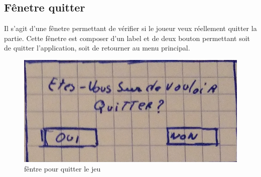 \subsection{Fênetre quitter}
Il s'agit d'une fênetre permettant de vérifier si le joueur veux réellement quitter la partie. Cette fênetre est composer d'un label et de deux bouton permettant soit de quitter l'application, soit de retourner au menu principal.
\begin{figure}[ht]
	\centering
	\includegraphics[scale=0.5]{fenetre_quitter.png}
	\caption{fêntre pour quitter le jeu}
	\label{fênetre pour quitter le jeu}
\end{figure} 

